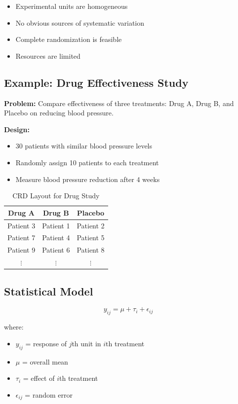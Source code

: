 \documentclass[twoside]{book}
\begin{document}
\begin{itemize}
    \item Experimental units are homogeneous
    \item No obvious sources of systematic variation
    \item Complete randomization is feasible
    \item Resources are limited
\end{itemize}

\subsection{Example: Drug Effectiveness Study}

\textbf{Problem:} Compare effectiveness of three treatments: Drug A, Drug B, and Placebo on reducing blood pressure.

\textbf{Design:}
\begin{itemize}
    \item 30 patients with similar blood pressure levels
    \item Randomly assign 10 patients to each treatment
    \item Measure blood pressure reduction after 4 weeks
\end{itemize}

\begin{table}[h]
\centering
\caption{CRD Layout for Drug Study}
\begin{tabular}{|c|c|c|}
\hline
\textbf{Drug A} & \textbf{Drug B} & \textbf{Placebo} \\
\hline
Patient 3 & Patient 1 & Patient 2 \\
Patient 7 & Patient 4 & Patient 5 \\
Patient 9 & Patient 6 & Patient 8 \\
$\vdots$ & $\vdots$ & $\vdots$ \\
\hline
\end{tabular}
\end{table}

\subsection{Statistical Model}

\begin{equation}
y_{ij} = \mu + \tau_i + \epsilon_{ij}
\end{equation}

where:
\begin{itemize}
    \item $y_{ij}$ = response of $j$th unit in $i$th treatment
    \item $\mu$ = overall mean
    \item $\tau_i$ = effect of $i$th treatment
    \item $\epsilon_{ij}$ = random error
\end{itemize}
\end{document}
